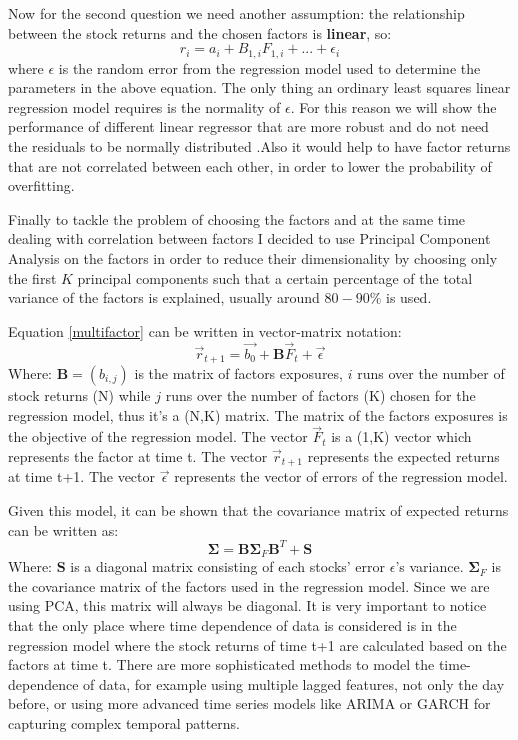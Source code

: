 Now for the second question we need another assumption: the relationship between the stock returns and the chosen factors is \textbf{linear}, so:
\begin{equation}
    r_i = a_i + B_{1,i}F_{1,i} + ... + \epsilon_i
    \label{multifactor}
\end{equation}
where $\epsilon$ is the random error from the regression model used to determine the parameters in the above equation. The only thing an ordinary least squares linear regression model requires is the normality of $\epsilon$. For this reason we will show the performance of different linear regressor that are more robust and do not need the residuals to be normally distributed .Also it would help to have factor returns that are not correlated between each other, in order to lower the probability of overfitting.

Finally to tackle the problem of choosing the factors and at the same time dealing with correlation between factors I decided to use Principal Component Analysis on the factors in order to reduce their dimensionality by choosing only the first $K$ principal components such that a certain percentage of the total variance of the factors is explained, usually around $80-90\%$ is used.

Equation \eqref{multifactor} can be written in vector-matrix notation:
\begin{equation}
    \Vec{r}_{t+1} = \vec{b_0} + \mathbf{B}\vec{F}_{t} + \vec{\epsilon}
    \label{linear-multifactor-model}
\end{equation}
Where: $\mathbf{B} = (b_{i,j})$ is the matrix of factors exposures, $i$ runs over the number of stock returns (N) while $j$ runs over the number of factors (K) chosen for the regression model, thus it's a (N,K) matrix. The matrix of the factors exposures is the objective of the regression model. The vector $\vec{F}_{t}$ is a (1,K) vector which represents the factor at time t. The vector $\vec{r}_{t+1}$ represents the expected returns at time t+1. The vector $\vec{\epsilon}$ represents the vector of errors of the regression model.

Given this model, it can be shown that the covariance matrix of expected returns can be written as:
\begin{equation}
    \mathbf{\Sigma} = \mathbf{B}\mathbf{\Sigma}_{F}\mathbf{B}^{T} + \mathbf{S}
    \label{cov-matrix-returns}
\end{equation}
Where: $\mathbf{S}$ is a diagonal matrix consisting of each stocks' error $\epsilon$'s variance. $\mathbf{\Sigma}_{F}$ is the covariance matrix of the factors used in the regression model. Since we are using PCA, this matrix will always be diagonal.
It is very important to notice that the only place where time dependence of data is considered is in the regression model where the stock returns of time t+1 are calculated based on the factors at time t. There are more sophisticated methods to model the time-dependence of data, for example using multiple lagged features, not only the day before, or using more advanced time series models like ARIMA or GARCH for capturing complex temporal patterns.

